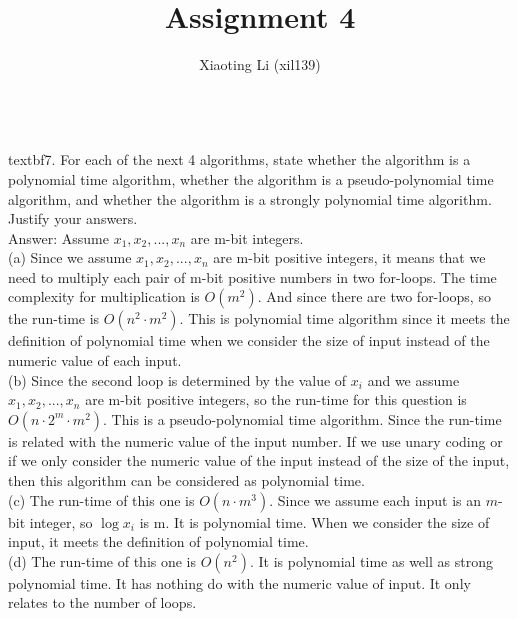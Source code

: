 \documentclass{article}
\title{Assignment 4}
\author{Xiaoting Li (xil139)}
\date{}
\begin{document}
\maketitle

\noindent
\\textbf{7. For each of the next 4 algorithms, state whether the algorithm is a polynomial time algorithm, whether the algorithm is a pseudo-polynomial time algorithm, and whether the algorithm is a strongly polynomial time algorithm. Justify your answers.} \\ \newline
Answer: Assume $x_1, x_2, ..., x_n$ are m-bit integers. \\
(a) Since we assume $x_1, x_2, ..., x_n$ are m-bit positive integers, it means that we need to multiply each pair of m-bit positive numbers in two for-loops. The time complexity for multiplication is $O(m^{2})$. And since there are two for-loops, so the run-time is $O(n^{2}\cdot m{^2})$. This is polynomial time algorithm since it meets the definition of polynomial time when we consider the size of input instead of the numeric value of each input.\\
(b) Since the second loop is determined by the value of $x_i$ and we assume $x_1, x_2, ..., x_n$ are m-bit positive integers, so the run-time for this question is $O(n\cdot 2^{m}\cdot m{^2})$. This is a pseudo-polynomial time algorithm. Since the run-time is related with the numeric value of the input number. If we use unary coding or if we only consider the numeric value of the input instead of the size of the input, then this algorithm can be considered as polynomial time. \\
(c) The run-time of this one is $O(n\cdot m^{3})$. Since we assume each input is an $m$-bit integer, so $\log{x_i}$ is m. It is polynomial time. When we consider the size of input, it meets the definition of polynomial time.\\
(d) The run-time of this one is $O(n^{2})$. It is polynomial time as well as strong polynomial time. It has nothing do with the numeric value of input. It only relates to the number of loops.\\ \newline
\end{document}
